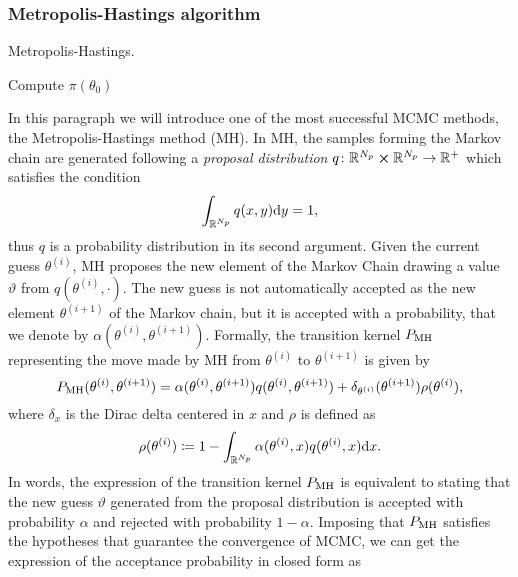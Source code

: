 \subsubsection{Metropolis-Hastings algorithm}
\begin{algorithm}[t]
	\caption{Metropolis-Hastings.}
	\label{alg:MH}
	Compute $\pi(\theta_0)$ \;
\end{algorithm}
In this paragraph we will introduce one of the most successful MCMC methods, the Metropolis-Hastings method (MH). In MH, the samples forming the Markov chain are generated following a \textit{proposal distribution} $q\colon \mathbb{R}^{N_p} \cross \mathbb{R}^{N_p} \to \mathbb{R}^+$ which satisfies the condition
\begin{equation}
	\int_{\mathbb{R}^{N_p}}q(x, y)\dd y = 1,
\end{equation}
thus $q$ is a probability distribution in its second argument. Given the current guess $\theta^{(i)}$, MH proposes the new element of the Markov Chain drawing a value $\vartheta$ from $q(\theta^{(i)}, \cdot)$. The new guess is not automatically accepted as the new element $\theta^{(i+1)}$ of the Markov chain, but it is accepted with a probability, that we denote by $\alpha(\theta^{(i)}, \theta^{(i+1)})$. Formally, the transition kernel $P_{\mathrm{MH}}$ representing the move made by MH from $\theta^{(i)}$ to $\theta^{(i+1)}$ is given by \cite{MLR16}
\begin{equation}
	P_{\mathrm{MH}}(\theta^{(i)}, \theta^{(i+1)}) = \alpha(\theta^{(i)}, \theta^{(i+1)})q(\theta^{(i)},\theta^{(i+1)}) + \delta_{\theta^{(i)}}(\theta^{(i+1)})\rho(\theta^{(i)}),
\end{equation}
where $\delta_x$ is the Dirac delta centered in $x$ and $\rho$ is defined as
\begin{equation}
	\rho(\theta^{(i)}) \coloneqq 1 - \int_{\mathbb{R}^{N_p}}\alpha(\theta^{(i)}, x)q(\theta^{(i)}, x)\dd x.
\end{equation}
In words, the expression of the transition kernel $P_{\mathrm{MH}}$ is equivalent to stating that the new guess $\vartheta$ generated from the proposal distribution is accepted with probability $\alpha$ and rejected with probability $1 - \alpha$. Imposing that $P_{\mathrm{MH}}$ satisfies the hypotheses that guarantee the convergence of MCMC, we can get the expression of the acceptance probability in closed form as 
